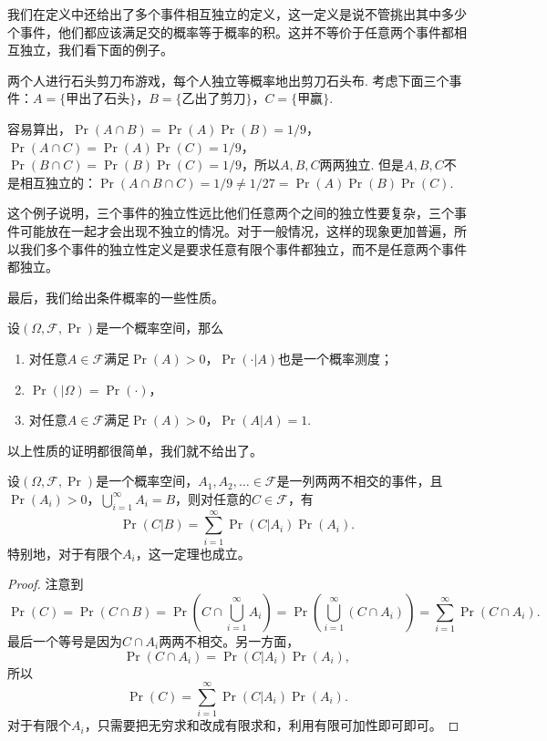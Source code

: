 我们在定义中还给出了多个事件相互独立的定义，这一定义是说不管挑出其中多少个事件，他们都应该满足交的概率等于概率的积。这并不等价于任意两个事件都相互独立，我们看下面的例子。

\begin{example}
两个人进行石头剪刀布游戏，每个人独立等概率地出剪刀石头布. 考虑下面三个事件：$A=\{\text{甲出了石头}\}$，$B=\{\text{乙出了剪刀}\}$，$C=\{\text{甲赢}\}$.

容易算出，$\Pr(A\cap B)=\Pr(A)\Pr(B)=1/9$，$\Pr(A\cap C)=\Pr(A)\Pr(C)=1/9$，$\Pr(B\cap C)=\Pr(B)\Pr(C)=1/9$，所以$A,B,C$两两独立. 但是$A,B,C$不是相互独立的：$\Pr(A\cap B\cap C)=1/9\neq 1/27=\Pr(A)\Pr(B)\Pr(C)$.
\end{example}

这个例子说明，三个事件的独立性远比他们任意两个之间的独立性要复杂，三个事件可能放在一起才会出现不独立的情况。对于一般情况，这样的现象更加普遍，所以我们多个事件的独立性定义是要求任意有限个事件都独立，而不是任意两个事件都独立。

最后，我们给出条件概率的一些性质。

\begin{proposition}\label{prop:conditional-probability}
设$(\Omega,\mathscr{F},\Pr)$是一个概率空间，那么
\begin{enumerate}
    \item 对任意$A\in\mathscr{F}$满足$\Pr(A)>0$，$\Pr(\cdot|A)$也是一个概率测度；
    \item $\Pr(|\Omega)=\Pr(\cdot)$，
    \item 对任意$A\in\mathscr{F}$满足$\Pr(A)>0$，$\Pr(A|A)=1$.
\end{enumerate}
\end{proposition}
以上性质的证明都很简单，我们就不给出了。

\begin{theorem}[全概率公式]\label{thm:total-probability}
设$(\Omega,\mathscr{F},\Pr)$是一个概率空间，$A_1,A_2,\ldots\in\mathscr{F}$是一列两两不相交的事件，且$\Pr(A_i)>0$，$\bigcup_{i=1}^\infty A_i=B$，则对任意的$C\in\mathscr{F}$，有
\[
    \Pr(C|B) = \sum_{i=1}^\infty \Pr(C|A_i)\Pr(A_i).
\]
特别地，对于有限个$A_i$，这一定理也成立。
\end{theorem}
\begin{proof}
注意到
\[
    \Pr(C) = \Pr(C\cap B) = \Pr\left(C\cap\bigcup_{i=1}^\infty A_i\right) = \Pr\left(\bigcup_{i=1}^\infty (C\cap A_i)\right) = \sum_{i=1}^\infty \Pr(C\cap A_i).
\]
最后一个等号是因为$C\cap A_i$两两不相交。另一方面，
\[
    \Pr(C\cap A_i) = \Pr(C|A_i)\Pr(A_i),
\]
所以
\[
    \Pr(C) = \sum_{i=1}^\infty \Pr(C|A_i)\Pr(A_i).
\]
对于有限个$A_i$，只需要把无穷求和改成有限求和，利用有限可加性即可即可。
\end{proof}


